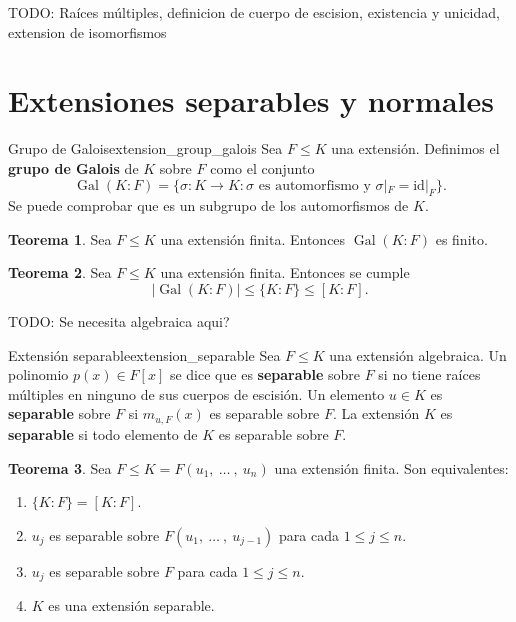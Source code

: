 \documentclass[a4paper]{book}
\theoremstyle{definition}
\newtheorem{theorem}{Teorema}[section]
\theoremstyle{ejemplo}
\theoremstyle{demostracion}
\DeclareMathOperator{\grupogalois}{Gal}
\begin{document}
TODO: Raíces múltiples, definicion de cuerpo de escision, existencia y unicidad, extension de isomorfismos 

\section{Extensiones separables y normales}
\begin{define}{Grupo de Galois}{extension_group_galois}
	Sea $F \leq K$ una extensión. Definimos el \textbf{grupo de Galois} de $K$ sobre $F$ como el conjunto
	\begin{equation*}
		\grupogalois(K:F) = \{\sigma: K \rightarrow K:\sigma \text{ es automorfismo y } \sigma|_F = \text{id}|_F \}.
	\end{equation*}
	Se puede comprobar que es un subgrupo de los automorfismos de $K$.
\end{define}

\begin{theorem}
	Sea $F \leq K$ una extensión finita. Entonces $\grupogalois(K:F)$ es finito.
\end{theorem}

\begin{theorem}
	Sea $F \leq K$ una extensión finita. Entonces se cumple
	\begin{equation*}
		|\grupogalois(K:F)| \leq \{K:F\} \leq [K:F].
	\end{equation*}
\end{theorem}

TODO: Se necesita algebraica aqui?
\begin{define}{Extensión separable}{extension_separable}
	Sea $F \leq K$ una extensión algebraica. Un polinomio $p(x) \in F[x]$ se dice que es \textbf{separable} sobre $F$ si no tiene raíces múltiples en ninguno de sus cuerpos de escisión. Un elemento $u \in K$ es \textbf{separable} sobre $F$ si $m_{u,F}(x)$ es separable sobre $F$. La extensión $K$ es \textbf{separable} si todo elemento de $K$ es separable sobre $F$.
\end{define}

\begin{theorem}
	Sea $F \leq K = F(u_1,\ \ldots\ ,\ u_n)$ una extensión finita. Son equivalentes:
	\begin{enumerate}
		\item
		$\{K:F\} = [K:F]$.
		\item
		$u_j$ es separable sobre $F(u_1,\ \ldots\ ,\ u_{j-1})$ para cada $1 \leq j \leq n$.
		\item
		$u_j$ es separable sobre $F$ para cada $1 \leq j \leq n$. 
		\item
		$K$ es una extensión separable.
	\end{enumerate}
\end{theorem}
\end{document}
